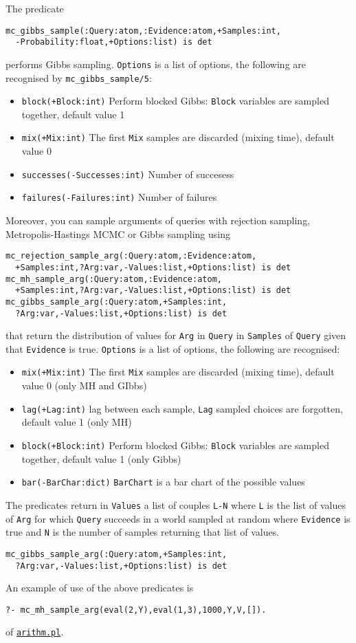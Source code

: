 The predicate
\begin{verbatim}
mc_gibbs_sample(:Query:atom,:Evidence:atom,+Samples:int,
  -Probability:float,+Options:list) is det
\end{verbatim}
performs Gibbs sampling.
\verb|Options| is a list of options, the following are recognised by \verb|mc_gibbs_sample/5|:
\begin{itemize}
\item \verb|block(+Block:int)|
   Perform blocked Gibbs: \verb|Block| variables are sampled together, default value 1
\item \verb|mix(+Mix:int)|
   The first \verb|Mix| samples are discarded (mixing time), default value 0
\item \verb|successes(-Successes:int)|
Number of succesess
\item \verb|failures(-Failures:int)|
Number of failures
\end{itemize}
Moreover, you can sample arguments of queries with rejection sampling, Metropolis-Hastings MCMC or Gibbs sampling using
\begin{verbatim}
mc_rejection_sample_arg(:Query:atom,:Evidence:atom,
  +Samples:int,?Arg:var,-Values:list,+Options:list) is det
mc_mh_sample_arg(:Query:atom,:Evidence:atom,
  +Samples:int,?Arg:var,-Values:list,+Options:list) is det
mc_gibbs_sample_arg(:Query:atom,+Samples:int,
  ?Arg:var,-Values:list,+Options:list) is det
\end{verbatim}
that return the distribution of values for \verb|Arg| in \verb|Query| in \verb|Samples| of
\verb|Query| given that \verb|Evidence| is true.
\verb|Options| is a list of options, the following are recognised:
\begin{itemize}
\item \verb|mix(+Mix:int)|
The first  \verb|Mix| samples are discarded (mixing time), default value 0 (only MH and GIbbs)
\item \verb|lag(+Lag:int)|
lag between each sample, \verb|Lag| sampled choices are forgotten, default value 1 (only MH)
\item \verb|block(+Block:int)|
   Perform blocked Gibbs: \verb|Block| variables are sampled together, default value 1 (only Gibbs)
\item \verb|bar(-BarChar:dict)|
    \verb|BarChart| is a bar chart of the possible values
\end{itemize}
The predicates return in \verb|Values| a list of couples \verb|L-N| where
\verb|L| is the list of values of \verb|Arg| for which \verb|Query|
succeeds in a world sampled at random where \verb|Evidence| is true and \verb|N|
is the number of samples returning that list of values.
\begin{verbatim}
mc_gibbs_sample_arg(:Query:atom,+Samples:int,
  ?Arg:var,-Values:list,+Options:list) is det
\end{verbatim}
An example of use of the above predicates is
\begin{verbatim}
?- mc_mh_sample_arg(eval(2,Y),eval(1,3),1000,Y,V,[]).
\end{verbatim}
of \href{http://cplint.eu/e/arithm.pl}{\texttt{arithm.pl}}.


